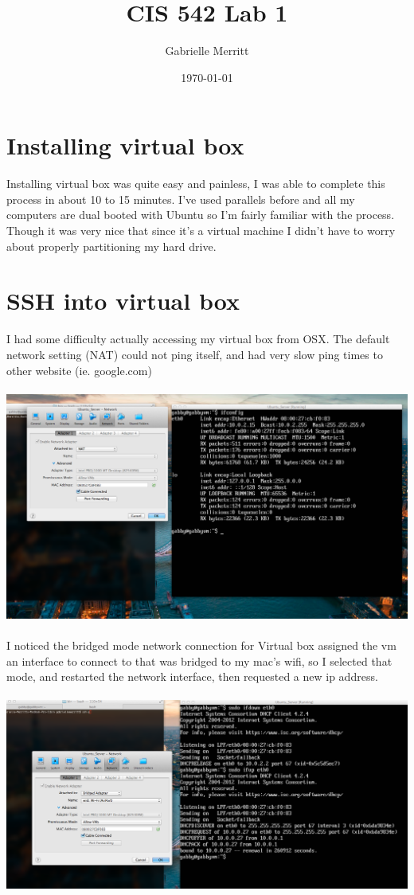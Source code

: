 \documentclass{article}
\title{CIS 542 Lab 1}
\author{Gabrielle Merritt}
\date{\today}
\begin{document}
\maketitle
\section{Installing virtual box} 
Installing virtual box was quite easy and painless, I was able to complete this process in about 10 to 15 minutes. I've used parallels before and all my computers are dual booted with Ubuntu so I'm fairly familiar with the process. Though it was very nice that since it's a virtual machine I didn't have to worry about properly partitioning my hard drive. 

\section{SSH into virtual box} 
I had some difficulty actually accessing my virtual box from OSX. 
The default network setting (NAT) could not ping itself, and had very slow ping times to other website (ie. google.com) 
\paragraph{}
\includegraphics[width =\linewidth]{NAT.png}
\paragraph{}
I noticed the bridged mode network connection for Virtual box assigned the vm an interface to connect to that was bridged to my mac's wifi, so I selected that mode, and restarted the network interface, then requested a new ip address.
\paragraph{}
\includegraphics[width = \linewidth]{Bridge.png}
\end{document}

